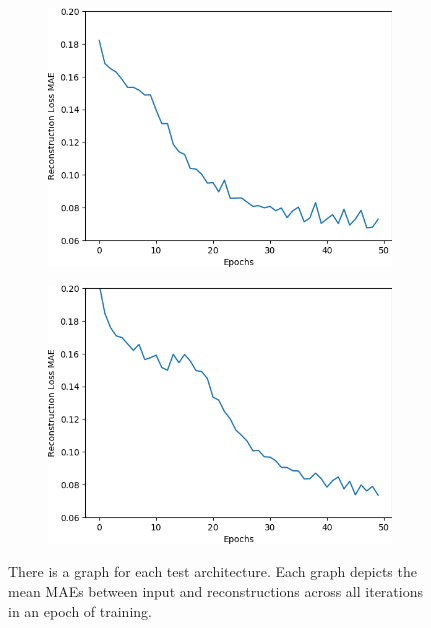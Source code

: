 \begin{figure}[H]
\begin{subfigure}{.25\textwidth}
        \centering
        \includegraphics[width=\textwidth]
        {images/figures/experiments_architecture/mae_graphKernel3adjusted16x16x64_dim1024.png}
        \caption{}
    \end{subfigure}%
    \begin{subfigure}{.25\textwidth}
        \centering
        \includegraphics[width=\textwidth]
        {images/figures/experiments_architecture/mae_graphKernel3adjusted32x32x32_dim1024.png}
        \caption{}
    \end{subfigure}
    \caption{There is a graph for each test architecture.
    Each graph depicts the mean MAEs between input and reconstructions across all iterations in an epoch of training.}
\end{figure} \label{figure_learning_curves2}

